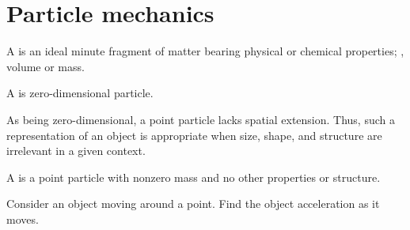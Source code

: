 
\section{Particle mechanics}
%
\begin{definition}[Particle]
  A  is an ideal minute fragment of matter bearing physical or chemical properties; \eg, volume or mass.
\end{definition}

\begin{definition}
  A  is zero-dimensional particle.
\end{definition}

\begin{note}
  As being zero-dimensional, a point particle lacks spatial extension. Thus, such a representation of an object is appropriate when size, shape, and structure are irrelevant in a given context.
\end{note}

\begin{definition}
  A  is a point particle with nonzero mass and no other properties or structure.
\end{definition}

\begin{exercise}
  Consider an object moving around a point. Find the object acceleration as it moves.
\end{exercise}


